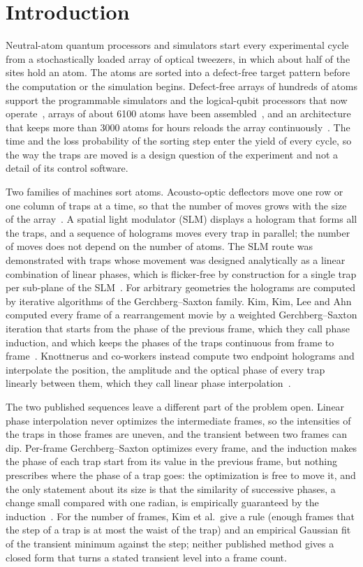 \section{Introduction}\label{sec:intro}

Neutral-atom quantum processors and simulators start every experimental cycle from a stochastically loaded array of optical tweezers, in which about half of the sites hold an atom. The atoms are sorted into a defect-free target pattern before the computation or the simulation begins. Defect-free arrays of hundreds of atoms support the programmable simulators and the logical-qubit processors that now operate~\cite{ebadi,bluvstein}, arrays of about 6100 atoms have been assembled~\cite{manetsch}, and an architecture that keeps more than 3000 atoms for hours reloads the array continuously~\cite{chiu}. The time and the loss probability of the sorting step enter the yield of every cycle, so the way the traps are moved is a design question of the experiment and not a detail of its control software.

Two families of machines sort atoms. Acousto-optic deflectors move one row or one column of traps at a time, so that the number of moves grows with the size of the array~\cite{endres,barredo}. A spatial light modulator (SLM) displays a hologram that forms all the traps, and a sequence of holograms moves every trap in parallel; the number of moves does not depend on the number of atoms. The SLM route was demonstrated with traps whose movement was designed analytically as a linear combination of linear phases, which is flicker-free by construction for a single trap per sub-plane of the SLM~\cite{kim2016}. For arbitrary geometries the holograms are computed by iterative algorithms of the Gerchberg--Saxton family. Kim, Kim, Lee and Ahn computed every frame of a rearrangement movie by a weighted Gerchberg--Saxton iteration that starts from the phase of the previous frame, which they call phase induction, and which keeps the phases of the traps continuous from frame to frame~\cite{kimoe}. Knottnerus and co-workers instead compute two endpoint holograms and interpolate the position, the amplitude and the optical phase of every trap linearly between them, which they call linear phase interpolation~\cite{lpi}.

The two published sequences leave a different part of the problem open. Linear phase interpolation never optimizes the intermediate frames, so the intensities of the traps in those frames are uneven, and the transient between two frames can dip. Per-frame Gerchberg--Saxton optimizes every frame, and the induction makes the phase of each trap start from its value in the previous frame, but nothing prescribes where the phase of a trap goes: the optimization is free to move it, and the only statement about its size is that the similarity of successive phases, a change small compared with one radian, is empirically guaranteed by the induction~\cite{kimoe}. For the number of frames, Kim et al.\ give a rule (enough frames that the step of a trap is at most the waist of the trap) and an empirical Gaussian fit of the transient minimum against the step; neither published method gives a closed form that turns a stated transient level into a frame count.

